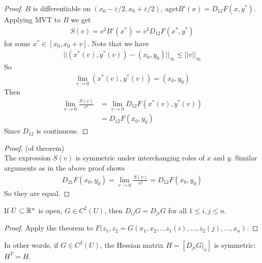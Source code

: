 \documentclass[a4paper]{article}
\begin{document}
\begin{lemma}
\begin{proof}
$B$ is differentiable on $(x_0-\varepsilon/2,x_0+\varepsilon/2)$, aget$B'(x)=D_{12}F(x,y^*)$. Applying MVT to $B$ we get
\begin{equation*}
\begin{aligned}
S(v)=v^2 B'(x^*)=v^2D_{12}F(x^*,y^*)
\end{aligned}
\end{equation*}
for some $x^* \in [x_0,x_0+v]$. Note that we have
\begin{equation*}
\begin{aligned}
||(x^*(v),y^*(v))-(x_0,y_0)||_\infty \leq ||v||_\infty
\end{aligned}
\end{equation*}
So
\begin{equation*}
\begin{aligned}
\lim_{v \to 0} (x^*(v),y^*(v)) = (x_0,y_0)
\end{aligned}
\end{equation*}
Then
\begin{equation*}
\begin{aligned}
\lim_{v \to 0} \frac{S(v)}{v^2}&=\lim_{v \to 0} D_{12} F(x^*(v),y^*(v))\\
&=D_{12}F(x_0,y_0)
\end{aligned}
\end{equation*}
Since $D_{12}$ is continuous.
\end{proof}
\end{lemma}

\begin{proof} (of theorem)\\
The expression $S(v)$ is symmetric under interchanging roles of $x$ and $y$. Similar arguments as in the above proof shows
\begin{equation*}
\begin{aligned}
D_{21}F(x_0,y_0) = \lim_{v \to 0} \frac{S(v)}{v^2} = D_{12}F(x_0,y_0)
\end{aligned}
\end{equation*}
So they are equal.

\end{proof}

\begin{coro}
If $U \subset \mathbb{R}^n$ is open, $G \in C^2(U)$, then $D_{ij} G=D_{ji} G$ for all $1\leq i,j \leq n$.
\begin{proof}
Apply the theorem to $F(z_1,z_2 = G(x_1,x_2,...z_1(i),...,z_2(j),...,x_n)$.
\end{proof}
\end{coro}
In other words, if $G \in C^2(U)$, the Hessian matrix $H=[D_{ji}G|_x]$ is symmetric: $H^T = H$.
\end{document}
